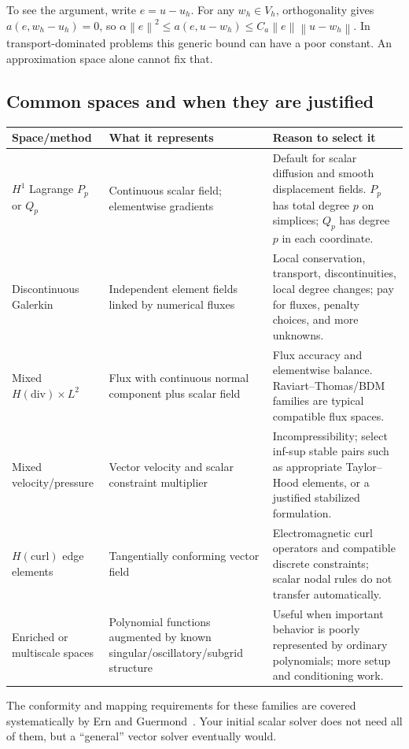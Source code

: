 \documentclass[11pt,a4paper]{article}
\newcommand{\norm}[1]{\left\lVert #1\right\rVert}
\begin{document}
To see the argument, write $e=u-u_h$. For any $w_h\in V_h$, orthogonality gives $a(e,w_h-u_h)=0$, so $\alpha\norm{e}^2\le a(e,u-w_h)\le C_a\norm{e}\norm{u-w_h}$. In transport-dominated problems this generic bound can have a poor constant. An approximation space alone cannot fix that.

\subsection{Common spaces and when they are justified}
\begin{longtable}{P{0.19\textwidth}P{0.34\textwidth}P{0.39\textwidth}}
\toprule
Space/method & What it represents & Reason to select it\\
\midrule\endhead
$H^1$ Lagrange $P_p$ or $Q_p$ & Continuous scalar field; elementwise gradients & Default for scalar diffusion and smooth displacement fields. $P_p$ has total degree $p$ on simplices; $Q_p$ has degree $p$ in each coordinate.\\
Discontinuous Galerkin & Independent element fields linked by numerical fluxes & Local conservation, transport, discontinuities, local degree changes; pay for fluxes, penalty choices, and more unknowns.\\
Mixed $H(\mathrm{div})\times L^2$ & Flux with continuous normal component plus scalar field & Flux accuracy and elementwise balance. Raviart--Thomas/BDM families are typical compatible flux spaces.\\
Mixed velocity/pressure & Vector velocity and scalar constraint multiplier & Incompressibility; select inf-sup stable pairs such as appropriate Taylor--Hood elements, or a justified stabilized formulation.\\
$H(\mathrm{curl})$ edge elements & Tangentially conforming vector field & Electromagnetic curl operators and compatible discrete constraints; scalar nodal rules do not transfer automatically.\\
Enriched or multiscale spaces & Polynomial functions augmented by known singular/oscillatory/subgrid structure & Useful when important behavior is poorly represented by ordinary polynomials; more setup and conditioning work.\\
\bottomrule
\end{longtable}
The conformity and mapping requirements for these families are covered systematically by Ern and Guermond~\cite{ern1}. Your initial scalar solver does not need all of them, but a ``general'' vector solver eventually would.
\end{document}
